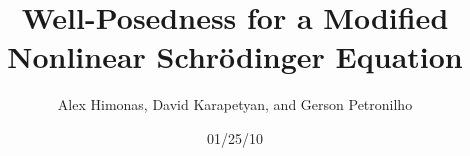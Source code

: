 \documentclass[12pt,reqno]{amsart}
\numberwithin{equation}{section}  %
\numberwithin{figure}{section}
\theoremstyle{plain}
\theoremstyle{definition}
\theoremstyle{remark}
\begin{document}
\title{Well-Posedness for a Modified Nonlinear Schr\"{o}dinger Equation }
\author{Alex Himonas, David Karapetyan, and Gerson Petronilho}
\address{Department of Mathematics  \\
University  of Notre Dame\\
Notre Dame, IN 46556 }
\address{Department of Mathematics \\
University  of Notre Dame\\
Notre Dame, IN 46556 }
\address{Departamento de Matemática \\
Universidade Federal de São
Carlos \\
Rodovia Washington Luiz, Km 235, São Carlos, SP,
13565-905, Brasil}
    
				  \date{01/25/10}
				  \maketitle
\end{document}
